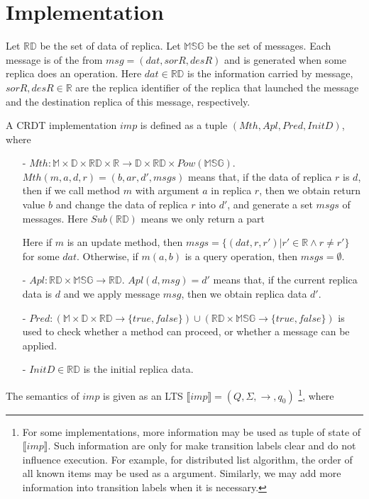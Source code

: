 
\section{Implementation}
\label{sec:implementation}

Let $\mathbb{RD}$ be the set of data of replica. Let $\mathbb{MSG}$ be the set of messages. Each message is of the from $msg=(dat,sorR,desR)$ and is generated when some replica does an operation. Here $dat \in \mathbb{RD}$ is the information carried by message, $sorR,desR \in \mathbb{R}$ are the replica identifier of the replica that launched the message and the destination replica of this message, respectively.

A CRDT implementation $imp$ is defined as a tuple $(Mth,Apl,Pred,InitD)$, where

\begin{itemize}
\setlength{\itemsep}{0.5pt}
\item[-] $Mth: \mathbb{M} \times \mathbb{D} \times \mathbb{RD} \times \mathbb{R} \rightarrow \mathbb{D} \times \mathbb{RD} \times Pow(\mathbb{MSG})$. $Mth(m,a,d,r) = (b,ar,d',msgs)$ means that, if the data of replica $r$ is $d$, then if we call method $m$ with argument $a$ in replica $r$, then we obtain return value $b$ and change the data of replica $r$ into $d'$, and generate a set $msgs$ of messages. Here $Sub(\mathbb{RD})$ means we only return a part

    Here if $m$ is an update method, then $msgs = \{ (dat,r,r') \vert r' \in \mathbb{R} \wedge r \neq r' \}$ for some $dat$. Otherwise, if $m(a,b)$ is a query operation, then $msgs = \emptyset$.

\item[-] $Apl: \mathbb{RD} \times \mathbb{MSG} \rightarrow \mathbb{RD}$. $Apl(d,msg) = d'$ means that, if the current replica data is $d$ and we apply message $msg$, then we obtain replica data $d'$.

\item[-] $Pred: (\mathbb{M} \times \mathbb{D} \times \mathbb{RD} \rightarrow \{ \textit{true},\textit{false} \}) \cup (\mathbb{RD} \times \mathbb{MSG} \rightarrow \{ \textit{true},\textit{false} \})$ is used to check whether a method can proceed, or whether a message can be applied.

\item[-] $InitD \in \mathbb{RD}$ is the initial replica data.
\end{itemize}

The semantics of $imp$ is given as an LTS $\llbracket imp \rrbracket = (Q,\Sigma,\rightarrow,q_0)$ \footnote{{\color {red} For some implementations, more information may be used as tuple of state of $\llbracket imp \rrbracket$. Such information are only for make transition labels clear and do not influence execution. For example, for distributed list algorithm, the order of all known items may be used as a argument. Similarly, we may add more information into transition labels when it is necessary.}}, where

